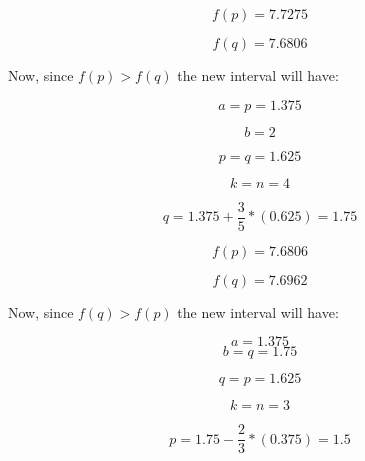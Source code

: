 \documentclass[a4paper]{article}
\begin{document}
\begin{equation}
f(p) = 7.7275
\end{equation}   

\begin{equation}
f(q) = 7.6806
\end{equation}

Now, since $f(p) > f(q)$ the new interval will have:

\begin{equation}
a = p = 1.375
\end{equation}

\begin{equation}
b = 2
\end{equation}

\begin{equation}
p = q = 1.625
\end{equation}



\begin{equation}
k = n = 4
\end{equation}

\begin{equation}
q = 1.375 + \dfrac{3}{5} * (0.625)  = 1.75
\end{equation}

\begin{equation}
f(p) = 7.6806    
\end{equation}   

\begin{equation}
f(q) = 7.6962
\end{equation}

Now, since $f(q) > f(p)$ the new interval will have:

\begin{equation}
a = 1.375
\end{equation}
\begin{equation}
b = q = 1.75
\end{equation}

\begin{equation}
q  = p = 1.625
\end{equation}


\begin{equation}
k = n = 3
\end{equation}

\begin{equation}
p = 1.75 -  \dfrac{2}{3} * (0.375)  = 1.5
\end{equation}
\end{document}
